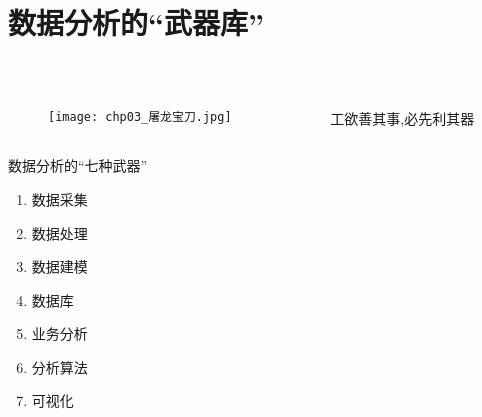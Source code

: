 
\section{数据分析的``武器库''}

\begin{frame}{\textcolor{white}{空白}}

  \begin{columns}
    \begin{column}{.5\textwidth}
      \begin{figure}
        \centering \texttt{[image: chp03\_屠龙宝刀.jpg]}
      \end{figure}
    \end{column}

    \begin{column}{.5\textwidth}
      \begin{ornamentblock}
        \centering
        {工欲善其事,必先利其器
          }
      \end{ornamentblock}
    \end{column}
  \end{columns}

\end{frame}

\begin{frame}{数据分析的``七种武器''}
\begin{enumerate}\large
\item 数据采集
\item 数据处理
\item 数据建模
\item 数据库
\item 业务分析
\item 分析算法
\item 可视化
\end{enumerate}
\end{frame}

